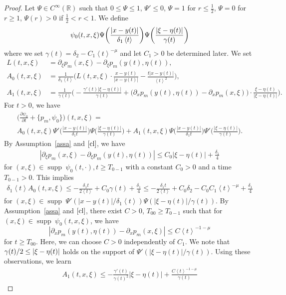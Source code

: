 \documentclass[10pt]{amsart}
\theoremstyle{definition}
\let\coloneqq\relax
\renewcommand*\c{\gamma}
\renewcommand*\d{\delta}
\newcommand*\g{\psi}
\newcommand*\m{\mu}
\newcommand*\x{\xi}
\newcommand*\y{\eta}
\newcommand{\G}{\Psi}
\newcommand*\re{\mathbb{R}}
\newcommand*\pa{\partial}
\newcommand*\coloneqq{\mathrel{\mathop:}=}
\DeclareMathOperator{\supp}{supp\;}
\newcommand{\jap}[1]{\left\langle #1 \right\rangle}
\newcommand{\bigpare}[1]{\bigl(#1\bigr)}
\newcommand{\biggpare}[1]{\biggl(#1\biggr)}
\begin{document}
\begin{proof}
Let $\Psi \in C^{\infty}(\re)$ such that $0\leq \Psi \leq 1$, $\Psi'\leq0$, $\Psi =1$ for $r \leq \frac{1}{2}$, $\Psi =0$ for $r\geq1$, $\Psi(r)>0$ if $\frac{1}{2}<r<1$. We define
\[
\g_0(t,x,\x)\coloneqq \Psi\biggpare{\frac{|x-y(t)|}{\d_1\jap{t}}}\Psi\biggpare{\frac{|\x-\y(t)|}{\c(t)}}
\]
where we set $\c(t)=\d_2-C_1\jap{t}^{-\m}$ and let $C_1>0$ be determined later. We set
\begin{align*}
L(t,x,\x)&=\pa_{\x}p_m(x,\x)-\pa_{\x}p_m(y(t),\y(t)),\\
A_0(t,x,\x)&=\frac{1}{\d_1\jap{t}}\biggpare{L(t,x,\x)\cdot \frac{x-y(t)}{|x-y(t)|} -\frac{t|x-y(t)|}{\jap{t}^2}},\\
A_1(t,x,\x)&=\frac{1}{\c(t)}\biggpare{-\frac{\c'(t)|\x-\y(t)|}{\c(t)}+\bigpare{\pa_xp_m(y(t),\y(t))-\pa_xp_m(x,\x)}\cdot \frac{\x-\y(t)}{|\x-\y(t)|}}.
\end{align*}
For $t>0$, we have
\begin{multline}\label{Psi0}
\biggpare{\frac{\pa \g_0}{\pa t}+\{p_m, \g_0 \}}(t, x,\x)=\\
A_0(t,x,\x)\Psi'\biggpare{\frac{|x-y(t)|}{\d_1t}}\Psi\biggpare{\frac{|\x-\y(t)|}{\c(t)}}
+A_1(t,x,\x) \Psi\biggpare{\frac{|x-y(t)|}{\d_1t}}\Psi'\biggpare{\frac{|\x-\y(t)|}{\c(t)}}.
\end{multline}
By Assumption~\ref{assa} and $\eqref{cl}$, we have
\begin{align*}
\left|\pa_{\x}p_m(x,\x)-\pa_{\x}p_m(y(t),\y(t))\right|\leq C_0|\x-\y(t)|+\frac{\d_1}{4}
\end{align*}
for $(x,\x)\in \supp \g_0(t,\cdot), t\geq T_{0-1}$ with a constant $C_0>0$ and a time $T_{0-1}>0$. This implies
\begin{align}\label{A_0}
\d_1\jap{t}A_0(t,x,\x)\leq -\frac{\d_1 t}{2\jap{t}}+C_0\c(t)+\frac{\d_1}{4}\leq -\frac{\d_1 t}{2\jap{t}}+C_0\d_2-C_0C_1\jap{t}^{-\m}+\frac{\d_1}{4}
\end{align}
for $(x,\x)\in \supp \Psi'(|x-y(t)|/\d_1\jap{t})\Psi(|\x-\y(t)|/\c(t))$. By Assumption~\ref{assa} and $\eqref{cl}$, there exist $C>0$, $T_{00}\geq T_{0-1}$ such that for $(x,\x)\in \supp \g_0(t,x,\x)$, we have
\[
\left|\pa_{x}p_m(y(t),\y(t))-\pa_{x}p_m(x,\x)\right|\leq C\jap{t}^{-1-\m}
\]
for $t\geq T_{00}$. Here, we can choose $C>0$ independently of $C_1$. We note that $\c(t)/2\linebreak\leq |\x-\y(t)|$ holds on the support of $\G'(|\x-\y(t)|/\c(t))$. Using these observations, we learn
\begin{multline}\label{A_1}
A_1(t,x,\x)\leq -\frac{\c'(t)}{\c(t)^2}|\x-\y(t)|+\frac{C\jap{t}^{-1-\m}}{\c(t)} 

\end{multline}
\end{proof}
\end{document}
